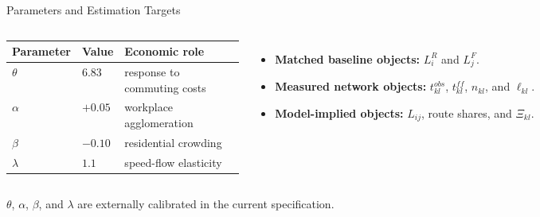 \documentclass[11pt,aspectratio=169]{beamer}
\newcommand{\app}[1]{\allowbreak\hspace{0.25em}\hyperlink{#1}{\beamergotobutton{details}}}
\begin{document}
\begin{frame}[label=estparams]{Parameters and Estimation Targets}
\small
\begin{columns}[T,onlytextwidth]
\scriptsize
\begin{tabularx}{\linewidth}{@{}p{0.18\linewidth}p{0.16\linewidth}X@{}}
\toprule
Parameter & Value & Economic role \\
\midrule
$\theta$ & $6.83$ & response to commuting costs \\
$\alpha$ & $+0.05$ & workplace agglomeration \\
$\beta$ & $-0.10$ & residential crowding \\
$\lambda$ & $1.1$ & speed-flow elasticity \\
\bottomrule
\end{tabularx}
\begin{itemize}\footnotesize
  \item \textbf{Matched baseline objects:} $L_i^R$ and $L_j^F$.
  \item \textbf{Measured network objects:} $t_{kl}^{obs}$, $t_{kl}^{ff}$, $n_{kl}$, and $\ell_{kl}$.
  \item \textbf{Model-implied objects:} $L_{ij}$, route shares, and $\Xi_{kl}$.
\end{itemize}
\end{columns}
\vspace{0.45em}
{\footnotesize $\theta$, $\alpha$, $\beta$, and $\lambda$ are externally calibrated in the current specification. \app{appparams}}
\end{frame}
\end{document}

